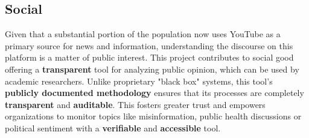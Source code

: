 \subsection{Social}

Given that a substantial portion of the population now uses YouTube as a primary source for news and information, understanding the discourse on this platform is a matter of public interest. This project contributes to social good offering a \textbf{transparent} tool for analyzing public opinion, which can be used by academic researchers. Unlike proprietary "black box" systems, this tool's \textbf{publicly documented methodology} ensures that its processes are completely \textbf{transparent} and \textbf{auditable}. This fosters greater trust and empowers organizations to monitor topics like misinformation, public health discussions or political sentiment with a \textbf{verifiable} and \textbf{accessible} tool.
